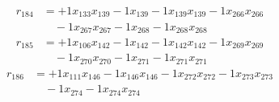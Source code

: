 \[\begin{aligned}
r_{184} &= + 1 x_{133} x_{139} - 1 x_{139} - 1 x_{139} x_{139} - 1 x_{266} x_{266} \\
 &\quad - 1 x_{267} x_{267} - 1 x_{268} - 1 x_{268} x_{268}
\end{aligned}\]
\[\begin{aligned}
r_{185} &= + 1 x_{106} x_{142} - 1 x_{142} - 1 x_{142} x_{142} - 1 x_{269} x_{269} \\
 &\quad - 1 x_{270} x_{270} - 1 x_{271} - 1 x_{271} x_{271}
\end{aligned}\]
\[\begin{aligned}
r_{186} &= + 1 x_{111} x_{146} - 1 x_{146} x_{146} - 1 x_{272} x_{272} - 1 x_{273} x_{273} \\
 &\quad - 1 x_{274} - 1 x_{274} x_{274}
\end{aligned}\]
